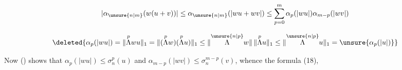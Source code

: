\[
|\alpha_{\unsure{n|m}}(w(u+v))|\leq\alpha_{\unsure{n|m}}(|wu+wv|)\leq\sum_{p=0}^{m}\alpha_p(|wu|)\alpha_{m-p}(|wv|)
\]


\[
\deleted{\alpha_p(|wu|)=\lVert\overset{p}{\Lambda}wu\rVert_1=\lVert(\overset{p}{\Lambda}w)(\overset{p}{\Lambda}u)\rVert_1\leq\lVert\overset{\unsure{n|p}}{\Lambda}w\rVert\,\lVert\overset{p}{\Lambda}u\rVert_1\leq\lVert\overset{\unsure{n|p}}{\Lambda}u\rVert_1=\unsure{\alpha_p(|u|)}}
\]

 Now () shows that $\alpha_p(|wu|)\leq\sigma_n^p(u)$ and $\alpha_{m-p}(|wv|)\leq\sigma_n^{m-p}(v)$, whence the formula (18),
